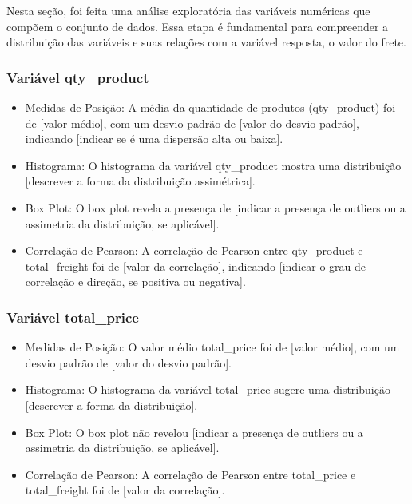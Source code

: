 \documentclass[
]{article}
\begin{document}
Nesta seção, foi feita uma análise exploratória das variáveis numéricas
que compõem o conjunto de dados. Essa etapa é fundamental para
compreender a distribuição das variáveis e suas relações com a variável
resposta, o valor do frete.

\hypertarget{variuxe1vel-qty_product}{%
\subsubsection{Variável qty\_product}\label{variuxe1vel-qty_product}}

\begin{itemize}
\item
  Medidas de Posição: A média da quantidade de produtos (qty\_product)
  foi de {[}valor médio{]}, com um desvio padrão de {[}valor do desvio
  padrão{]}, indicando {[}indicar se é uma dispersão alta ou baixa{]}.
\item
  Histograma: O histograma da variável qty\_product mostra uma
  distribuição {[}descrever a forma da distribuição assimétrica{]}.
\item
  Box Plot: O box plot revela a presença de {[}indicar a presença de
  outliers ou a assimetria da distribuição, se aplicável{]}.
\item
  Correlação de Pearson: A correlação de Pearson entre qty\_product e
  total\_freight foi de {[}valor da correlação{]}, indicando {[}indicar
  o grau de correlação e direção, se positiva ou negativa{]}.
\end{itemize}

\hypertarget{variuxe1vel-total_price}{%
\subsubsection{Variável total\_price}\label{variuxe1vel-total_price}}

\begin{itemize}
\item
  Medidas de Posição: O valor médio total\_price foi de {[}valor
  médio{]}, com um desvio padrão de {[}valor do desvio padrão{]}.
\item
  Histograma: O histograma da variável total\_price sugere uma
  distribuição {[}descrever a forma da distribuição{]}.
\item
  Box Plot: O box plot não revelou {[}indicar a presença de outliers ou
  a assimetria da distribuição, se aplicável{]}.
\item
  Correlação de Pearson: A correlação de Pearson entre total\_price e
  total\_freight foi de {[}valor da correlação{]}.
\end{itemize}
\end{document}
